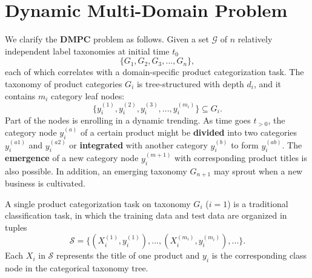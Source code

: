 
\section{Dynamic Multi-Domain Problem}
\label{appdix:task}
We clarify the $\mathbf{DMPC}$ problem as follows. Given a set $\mathcal{G}$ of $n$ relatively independent label taxonomies at initial time $t_0$
$$
\{G_1, G_2, G_3, ..., G_n\},
$$
each of which correlates with a domain-specific product categorization task. The taxonomy of product categories $G_i$ is tree-structured with depth $d_i$, and it contains $m_i$ category leaf nodes:
$$
\{y_i^{(1)}, y_i^{(2)}, y_i^{(3)}, ..., y_i^{(m_i)}\} \subseteq G_i.
$$
Part of the nodes is enrolling in a dynamic trending. As time goes $t_{>0}$, the category node $y_i^{(a)}$ of a certain product might be \textbf{divided} into two categories $y_i^{(a1)}$ and $y_i^{(a2)}$ or \textbf{integrated} with another category $y_i^{(b)}$ to form $y_i^{(ab)}$. The \textbf{emergence} of a new category node $y_i^{(m+1)}$ with corresponding product titles is also possible.
In addition, an emerging taxonomy $G_{n+1}$ may sprout when a new business is cultivated.


A single product categorization task on taxonomy $G_i$ ($i=1$) is a traditional classification task, in which the training data and test data are organized in tuples 
$$
\mathcal{S}=\{(X_i^{(1)}, y_i^{(1)}),...,(X_i^{(m_i)}, y_i^{(m_i)}),...\}.
$$
Each $X_i$ in $\mathcal{S}$ represents the title of one product and $y_i$ is the corresponding class node in the categorical taxonomy tree.

